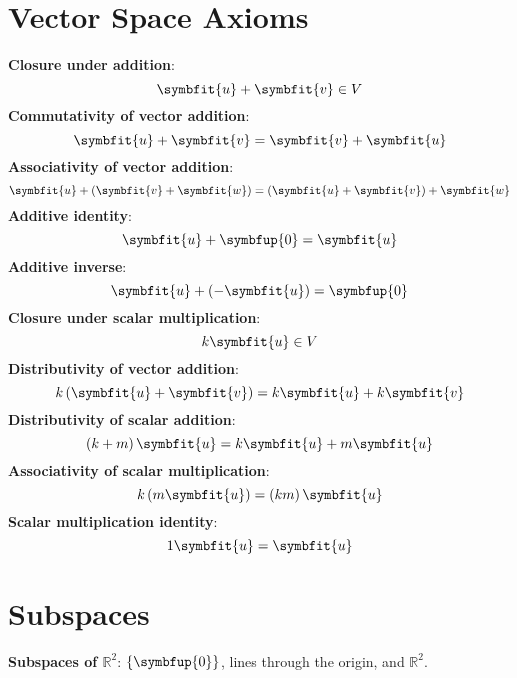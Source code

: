 \documentclass{article}
\begin{document}
\begin{multicols*}{2}
    \section*{Vector Space Axioms}
    \textbf{Closure under addition}:
    \begin{equation*}
        \symbfit{u}+\symbfit{v} \in V
    \end{equation*}
    \textbf{Commutativity of vector addition}:
    \begin{equation*}
        \symbfit{u} + \symbfit{v} = \symbfit{v} + \symbfit{u}
    \end{equation*}
    \textbf{Associativity of vector addition}:
    \begin{equation*}
        \symbfit{u} + \left(\symbfit{v} + \symbfit{w}\right) =
        \left(\symbfit{u} + \symbfit{v}\right) + \symbfit{w}
    \end{equation*}
    \textbf{Additive identity}:
    \begin{equation*}
        \symbfit{u} + \symbfup{0} = \symbfit{u}
    \end{equation*}
    \textbf{Additive inverse}:
    \begin{equation*}
        \symbfit{u} + \left(-\symbfit{u}\right) = \symbfup{0}
    \end{equation*}
    \textbf{Closure under scalar multiplication}:
    \begin{equation*}
        k\symbfit{u} \in V
    \end{equation*}
    \textbf{Distributivity of vector addition}:
    \begin{equation*}
        k \left(\symbfit{u} + \symbfit{v}\right) = k\symbfit{u} + k\symbfit{v}
    \end{equation*}
    \textbf{Distributivity of scalar addition}:
    \begin{equation*}
        \left(k+m\right)\symbfit{u} = k\symbfit{u} + m\symbfit{u}
    \end{equation*}
    \textbf{Associativity of scalar multiplication}:
    \begin{equation*}
        k\left(m\symbfit{u}\right)=\left(km\right)\symbfit{u}
    \end{equation*}
    \textbf{Scalar multiplication identity}:
    \begin{equation*}
        1 \symbfit{u}=\symbfit{u}
    \end{equation*}
    \section*{Subspaces}
    \textbf{Subspaces of \(\mathbb{R}^2\)}: \(\left\{ \symbfup{0} \right\}\),
    lines through the origin, and \(\mathbb{R}^2\).


\end{multicols*}
\end{document}
